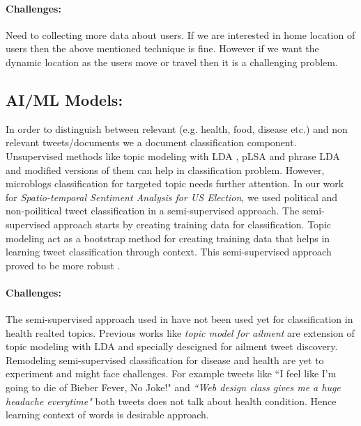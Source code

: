 \vspace{-2mm}
\paragraph{Challenges:}
Need to collecting more data about users. If we are interested in home location of users then the above mentioned \cite{compton2014geotagging} technique is fine. However if we want the dynamic location as the users move or travel then it is a challenging problem.


\subsection{AI/ML Models:}
In order to distinguish between relevant (e.g. health, food, disease etc.) and  non relevant tweets/documents we a document classification component. Unsupervised methods like topic modeling with LDA \cite{blei2003latent}, pLSA \cite{hofmann1999probabilistic} and phrase LDA \cite{el2014scalable} and modified versions of them can help in classification problem. However, microblogs classification for targeted topic needs further attention. In our work \cite{paul2017compass} for {\em Spatio-temporal Sentiment Analysis for US Election}, we used political and non-poilitical tweet classification in a semi-supervised approach. The semi-supervised approach starts by creating training data for classification. Topic modeling act as a bootstrap method for creating training data that helps in learning tweet classification through context. This semi-supervised approach proved to be more robust \cite{paul2017compass}.


\vspace{-2mm}
\paragraph{Challenges:}
The semi-supervised approach used in \cite{paul2017compass} have not been used yet for classification in health realted topics. Previous works like {\em topic model for ailment} \cite{paul2012model} are extension of topic modeling with LDA and specially descigned for ailment tweet discovery. Remodeling semi-supervised classification for disease and health are yet to experiment and might face challenges.
For example tweets like {``I feel like I'm going to die of Bieber Fever, No Joke!"} and  {\em ``Web design class gives me a huge headache everytime"} both tweets does not talk about health condition. Hence learning context of words is desirable approach.

